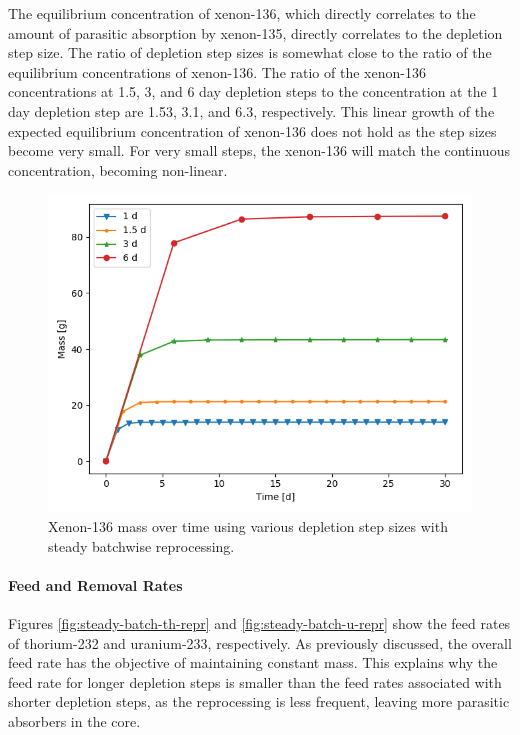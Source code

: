 {The equilibrium concentration of xenon-136, which directly correlates to the amount of parasitic absorption by xenon-135, directly correlates to the depletion step size.
The ratio of depletion step sizes is somewhat close to the ratio of the equilibrium concentrations of xenon-136.
The ratio of the xenon-136 concentrations at 1.5, 3, and 6 day depletion steps to the concentration at the 1 day depletion step are 1.53, 3.1, and 6.3, respectively.
This linear growth of the expected equilibrium concentration of xenon-136 does not hold as the step sizes become very small.
For very small steps, the xenon-136 will match the continuous concentration, becoming non-linear.

\begin{figure}[H]
  \centering
  \includegraphics[scale=0.7]{images/Xe136_sp_comp.png}
  \caption{Xenon-136 mass over time using various depletion step sizes with steady batchwise reprocessing.}
   \label{fig:steady-batch-xe136}
\end{figure}

\paragraph*{Feed and Removal Rates}

Figures \ref{fig:steady-batch-th-repr} and \ref{fig:steady-batch-u-repr} show the feed rates of thorium-232 and uranium-233, respectively. As previously discussed, the overall feed rate has the objective of maintaining constant mass. This explains why the feed rate for longer depletion steps is smaller than the feed rates associated with shorter depletion steps, as the reprocessing is less frequent, leaving more parasitic absorbers in the core.

}
